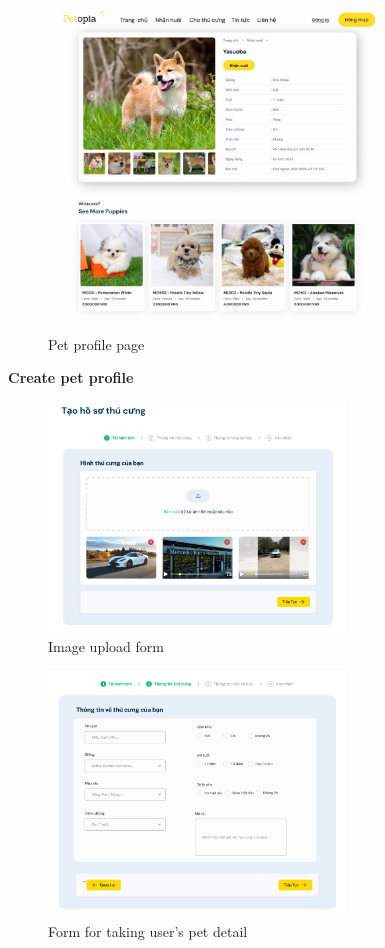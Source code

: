 \begin{figure}[H]
    \centering
    \includegraphics[width=0.8\textwidth]{Figures/pet_detail_ui.jpg}
    \caption{Pet profile page}
\end{figure}

\textbf{Create pet profile}

\begin{figure}[H]
    \centering
    \includegraphics[width=0.7\textwidth]{Figures/img_upload_ui.png}
    \caption{Image upload form}
\end{figure}

\begin{figure}[H]
    \centering
    \includegraphics[width=0.7\textwidth]{Figures/pet_input_ui.png}
    \caption{Form for taking user’s pet detail}
\end{figure}

